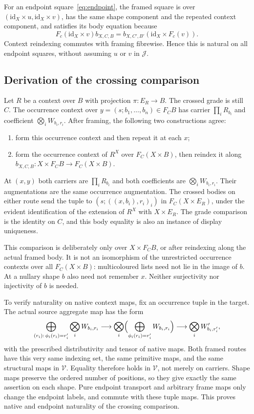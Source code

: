 \documentclass[11pt,a4paper]{article}
\theoremstyle{definition}
\newcommand{\V}{\mathcal V}
\newcommand{\J}{\mathcal J}
\newcommand{\id}{\mathrm{id}}
\begin{document}
For an endpoint square~\eqref{eq:endpoint}, the framed square is over
$(\id_X\times u,\id_X\times v)$, has the same shape component and the
repeated context component, and satisfies its body equation because
\[
 F_c(\id_X\times v)b_{X,C,B}
   =b_{X,C',B'}(\id_X\times F_c(v)).
\]
Context reindexing commutes with framing fibrewise. Hence this is natural
on all endpoint squares, without assuming $u$ or $v$ in $\J$.

\subsection{Derivation of the crossing comparison}
Let $R$ be a context over $B$ with projection $\pi:E_R\to B$.
The crossed grade is still $C$. The occurrence context over
$y=(s;b_1,\ldots,b_n)\in F_CB$ has carrier
$\prod_iR_{b_i}$ and coefficient $\bigotimes_iW_{b_i,r_i}$.
After framing, the following two constructions agree:
\begin{enumerate}[label=\textup{(\roman*)}]
\item form this occurrence context and then repeat it at each $x$;
\item form the occurrence context of $R^X$ over $F_C(X\times B)$,
then reindex it along $b_{X,C,B}:X\times F_CB\to F_C(X\times B)$.
\end{enumerate}
At $(x,y)$ both carriers are $\prod_iR_{b_i}$ and both coefficients are
$\bigotimes_iW_{b_i,r_i}$. Their augmentations are the same occurrence
augmentation. The crossed bodies on either route send the tuple to
$(s;((x,b_i),r_i)_i)$ in $F_C(X\times E_R)$, under the evident identification
of the extension of $R^X$ with $X\times E_R$.
The grade comparison is the identity on $C$, and this body equality is also
an instance of display uniqueness.

This comparison is deliberately only over $X\times F_CB$, or after
reindexing along the actual framed body. It is not an isomorphism of the
unrestricted occurrence contexts over all $F_C(X\times B)$:
multicoloured lists need not lie in the image of $b$. At a nullary shape
$b$ also need not remember $x$. Neither surjectivity nor injectivity of $b$
is needed.

To verify naturality on native context maps, fix an occurrence tuple in the
target. The actual source aggregate map has the form
\[
 \bigoplus_{(r_i):\,\phi_i(r_i)=r'_i}\bigotimes_iW_{b_i,r_i}
 \longrightarrow
 \bigotimes_i\Bigl(\bigoplus_{\phi_i(r_i)=r'_i}W_{b_i,r_i}\Bigr)
 \longrightarrow\bigotimes_iW'_{b_i,r'_i},
\]
with the prescribed distributivity and tensor of native maps.
Both framed routes have this very same indexing set, the same primitive
maps, and the same structural maps in $\V$. Equality therefore holds in
$\V$, not merely on carriers. Shape maps preserve the ordered number of
positions, so they give exactly the same assertion on each shape. Pure
endpoint transport and arbitrary frame maps only change the endpoint
labels, and commute with these tuple maps. This proves native and endpoint
naturality of the crossing comparison.
\end{document}
